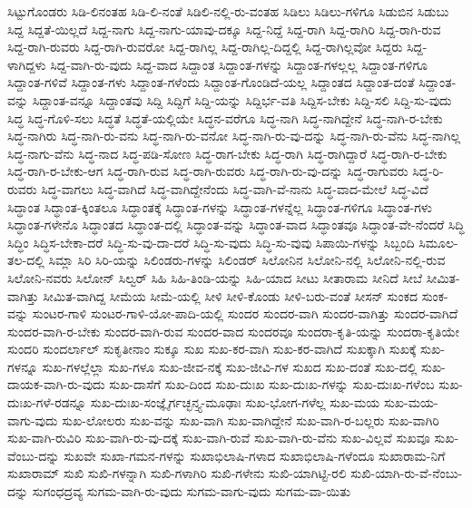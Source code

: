 {ಸಿಟ್ಟುಗೊಂಡರು
ಸಿಡಿ-ಲಿನಂತಹ
ಸಿಡಿ-ಲಿ-ನಂತೆ
ಸಿಡಿಲಿ-ನಲ್ಲಿ-ರು-ವಂತಹ
ಸಿಡಿಲು
ಸಿಡಿಲು-ಗಳಿಗೂ
ಸಿಡುಬಿನ
ಸಿಡುಬು
ಸಿದ್ದ
ಸಿದ್ದತೆ-ಯಿಲ್ಲದೆ
ಸಿದ್ದ-ನಾಗು
ಸಿದ್ದ-ನಾಗು-ಯಾವು-ದಕ್ಕೂ
ಸಿದ್ದ-ನಿದ್ದೆ
ಸಿದ್ದ-ರಾಗಿ
ಸಿದ್ದ-ರಾಗಿರಿ
ಸಿದ್ದ-ರಾಗಿ-ರುವ
ಸಿದ್ದ-ರಾಗಿ-ರುವರು
ಸಿದ್ದ-ರಾಗಿ-ರುವರೋ
ಸಿದ್ದ-ರಾಗಿಲ್ಲ
ಸಿದ್ದ-ರಾಗಿಲ್ಲ-ದಿದ್ದಲ್ಲಿ
ಸಿದ್ದ-ರಾಗಿಲ್ಲವೋ
ಸಿದ್ದರು
ಸಿದ್ದ-ಳಾಗಿದ್ದಳು
ಸಿದ್ದ-ವಾಗಿ-ರು-ವುದು
ಸಿದ್ದ-ವಾದ
ಸಿದ್ದಾಂತ
ಸಿದ್ದಾಂತ-ಗಳನ್ನು
ಸಿದ್ದಾಂತ-ಗಳಲ್ಲಲ್ಲ
ಸಿದ್ದಾಂತ-ಗಳಿಗೂ
ಸಿದ್ದಾಂತ-ಗಳಿವೆ
ಸಿದ್ದಾಂತ-ಗಳು
ಸಿದ್ದಾಂತ-ಗಳೆಂದು
ಸಿದ್ದಾಂತ-ಗೊಂಡಿದೆ-ಯಲ್ಲ
ಸಿದ್ದಾಂತದ
ಸಿದ್ದಾಂತ-ದಂತೆ
ಸಿದ್ದಾಂತ-ವನ್ನು
ಸಿದ್ದಾಂತ-ವನ್ನೂ
ಸಿದ್ದಾಂತವು
ಸಿದ್ದಿ
ಸಿದ್ದಿಗೆ
ಸಿದ್ದಿ-ಯನ್ನು
ಸಿದ್ದಿರ್ಭ-ವತಿ
ಸಿದ್ದಿಸ-ಬೇಕು
ಸಿದ್ದಿ-ಸಲಿ
ಸಿದ್ದಿ-ಸು-ವುದು
ಸಿದ್ಧ
ಸಿದ್ಧ-ಗೊಳಿ-ಸಲು
ಸಿದ್ಧತೆ
ಸಿದ್ಧತೆ-ಯಲ್ಲಿಯೇ
ಸಿದ್ಧನ-ವರೆಗೂ
ಸಿದ್ಧ-ನಾಗಿ
ಸಿದ್ಧ-ನಾಗಿದ್ದೇನೆ
ಸಿದ್ಧ-ನಾಗಿ-ರ-ಬೇಕು
ಸಿದ್ಧ-ನಾಗಿರು
ಸಿದ್ಧ-ನಾಗಿ-ರು-ವನು
ಸಿದ್ಧ-ನಾಗಿ-ರು-ವನೋ
ಸಿದ್ಧ-ನಾಗಿ-ರು-ವು-ದನ್ನು
ಸಿದ್ಧ-ನಾಗಿ-ರು-ವೆನು
ಸಿದ್ಧ-ನಾಗಿಲ್ಲ
ಸಿದ್ಧ-ನಾಗು-ವೆನು
ಸಿದ್ಧ-ನಾದ
ಸಿದ್ಧ-ಪಡಿ-ಸೋಣ
ಸಿದ್ಧ-ರಾಗ-ಬೇಕು
ಸಿದ್ಧ-ರಾಗಿ
ಸಿದ್ಧ-ರಾಗಿದ್ದಾರೆ
ಸಿದ್ಧ-ರಾಗಿ-ರ-ಬೇಕು
ಸಿದ್ಧ-ರಾಗಿ-ರ-ಬೇಕು-ಆಗ
ಸಿದ್ಧ-ರಾಗಿ-ರುವ
ಸಿದ್ಧ-ರಾಗಿ-ರುವರು
ಸಿದ್ಧ-ರಾಗಿ-ರು-ವು-ದನ್ನು
ಸಿದ್ಧ-ರಾಗುವರು
ಸಿದ್ಧ-ರಿ-ರುವರು
ಸಿದ್ಧ-ವಾಗಲು
ಸಿದ್ಧ-ವಾಗಿದೆ
ಸಿದ್ಧ-ವಾಗಿದ್ದೇನೆಂದು
ಸಿದ್ಧ-ವಾಗಿ-ವೆ-ನಾನು
ಸಿದ್ಧ-ವಾದ-ಮೇಲೆ
ಸಿದ್ಧ-ವಿದೆ
ಸಿದ್ಧಾಂತ
ಸಿದ್ಧಾಂತ-ಕ್ಕಿಂತಲೂ
ಸಿದ್ಧಾಂತಕ್ಕೆ
ಸಿದ್ಧಾಂತ-ಗಳನ್ನು
ಸಿದ್ಧಾಂತ-ಗಳನ್ನೆಲ್ಲ
ಸಿದ್ಧಾಂತ-ಗಳಿಗೂ
ಸಿದ್ಧಾಂತ-ಗಳು
ಸಿದ್ಧಾಂತ-ಗಳೇನೊ
ಸಿದ್ಧಾಂತದ
ಸಿದ್ಧಾಂತ-ದಲ್ಲಿ
ಸಿದ್ಧಾಂತ-ವನ್ನು
ಸಿದ್ಧಾಂತ-ವಾದ
ಸಿದ್ಧಾಂತವೂ
ಸಿದ್ಧಾಂತ-ವೇ-ನೆಂದರೆ
ಸಿದ್ಧಿ
ಸಿದ್ಧಿಂ
ಸಿದ್ಧಿಸ-ಬೇಕಾ-ದರೆ
ಸಿದ್ಧಿ-ಸು-ವು-ದಾ-ದರೆ
ಸಿದ್ಧಿ-ಸು-ವುದು
ಸಿದ್ಧಿ-ಸು-ವುವು
ಸಿಪಾಯಿ-ಗಳನ್ನು
ಸಿಬ್ಬಂದಿ
ಸಿಮೂಲ-ತಲ-ದಲ್ಲಿ
ಸಿಮ್ಲಾ
ಸಿರಿ
ಸಿರಿ-ಯನ್ನು
ಸಿಲಿಂಡರು-ಗಳನ್ನು
ಸಿಲಿಂಡರ್
ಸಿಲೋನಿನ
ಸಿಲೋನಿ-ನಲ್ಲಿ
ಸಿಲೋನಿ-ನಲ್ಲಿ-ರುವ
ಸಿಲೋನಿ-ನವರು
ಸಿಲೋನ್
ಸಿಲ್ವರ್
ಸಿಹಿ
ಸಿಹಿ-ತಿಂಡಿ-ಯನ್ನು
ಸಿಹಿ-ಯಾದ
ಸೀಟು
ಸೀತಾರಾಮ
ಸೀನಿದೆ
ಸೀಬೆ
ಸೀಮಿತ-ವಾಗಿತ್ತು
ಸೀಮಿತ-ವಾಗಿದ್ದ
ಸೀಮೆಯ
ಸೀಮೆ-ಯಲ್ಲಿ
ಸೀಳಿ
ಸೀಳಿ-ಕೊಂಡು
ಸೀಳಿ-ಬರು-ವಂತೆ
ಸೀಸನ್
ಸುಂಕದ
ಸುಂಕ-ವನ್ನು
ಸುಂಟರ-ಗಾಳಿ
ಸುಂಟರ-ಗಾಳಿ-ಯೋ-ಪಾದಿ-ಯಲ್ಲಿ
ಸುಂದರ
ಸುಂದರ-ವಾಗಿ
ಸುಂದರ-ವಾಗಿತ್ತು
ಸುಂದರ-ವಾಗಿದೆ
ಸುಂದರ-ವಾಗಿ-ರ-ಬೇಕು
ಸುಂದರ-ವಾಗಿ-ರುವ
ಸುಂದರ-ವಾದ
ಸುಂದರವೂ
ಸುಂದರಾ-ಕೃತಿ-ಯನ್ನು
ಸುಂದರಾ-ಕೃತಿಯೇ
ಸುಂದರಿ
ಸುಂದರ್ಲಾಲ್
ಸುಕೃತೀನಾಂ
ಸುಕ್ಕೂ
ಸುಖ
ಸುಖ-ಕರ-ವಾಗಿ
ಸುಖ-ಕರ-ವಾಗಿದೆ
ಸುಖಕ್ಕಾಗಿ
ಸುಖಕ್ಕೆ
ಸುಖ-ಗಳನ್ನೂ
ಸುಖ-ಗಳಲ್ಲೆಲ್ಲಾ
ಸುಖ-ಗಳೂ
ಸುಖ-ಜೀವ-ನಕ್ಕೆ
ಸುಖ-ಜೀವಿ-ಗಳ
ಸುಖದ
ಸುಖ-ದಂತೆ
ಸುಖ-ದಲ್ಲಿ
ಸುಖ-ದಾಯಕ-ವಾಗಿ-ರು-ವುದು
ಸುಖ-ದಾಸೆಗೆ
ಸುಖ-ದಿಂದ
ಸುಖ-ದುಃಖ
ಸುಖ-ದುಃಖ-ಗಳನ್ನು
ಸುಖ-ದುಃಖ-ಗಳೆಂಬ
ಸುಖ-ದುಃಖ-ಗಳೆ-ರಡನ್ನೂ
ಸುಖ-ದುಃಖ-ಸಂಜ್ಞೈರ್ಗಚ್ಛನ್ತ್ಯ-ಮೂಢಾಃ
ಸುಖ-ಭೋಗ-ಗಳೆಲ್ಲ
ಸುಖ-ಮಯ
ಸುಖ-ಮಯ-ವಾಗು-ವುದು
ಸುಖ-ಲೋಲರು
ಸುಖ-ವನ್ನು
ಸುಖ-ವಾಗಿ
ಸುಖ-ವಾಗಿದ್ದೇನೆ
ಸುಖ-ವಾಗಿ-ರ-ಬಲ್ಲರು
ಸುಖ-ವಾಗಿರಿ
ಸುಖ-ವಾಗಿ-ರುವಿರಿ
ಸುಖ-ವಾಗಿ-ರು-ವು-ದಕ್ಕೆ
ಸುಖ-ವಾಗಿ-ರುವೆ
ಸುಖ-ವಾಗಿ-ರು-ವೆನು
ಸುಖ-ವಿಲ್ಲವೆ
ಸುಖವೂ
ಸುಖ-ವೆಂಬು-ದನ್ನು
ಸುಖವೇ
ಸುಖಾ-ಗಮನ-ಗಳನ್ನು
ಸುಖಾಭಿಲಾಷಿ-ಗಳಾದ
ಸುಖಾಭಿಲಾಷಿ-ಗಳೆಂದೂ
ಸುಖಾರಾಮ-ನಿಗೆ
ಸುಖಾರಾಮ್
ಸುಖಿ
ಸುಖಿ-ಗಳನ್ನಾಗಿ
ಸುಖಿ-ಗಳಾಗಿರಿ
ಸುಖಿ-ಗಳೇನು
ಸುಖಿ-ಯಾಗಿಟ್ಟಿ-ರಲಿ
ಸುಖಿ-ಯಾಗಿ-ರು-ವೆ-ನೆಂಬು-ದನ್ನು
ಸುಗಂಧದ್ರವ್ಯ
ಸುಗಮ-ವಾಗಿ-ರು-ವುದು
ಸುಗಮ-ವಾಗು-ವುದು
ಸುಗಮ-ವಾ-ಯಿತು
}
